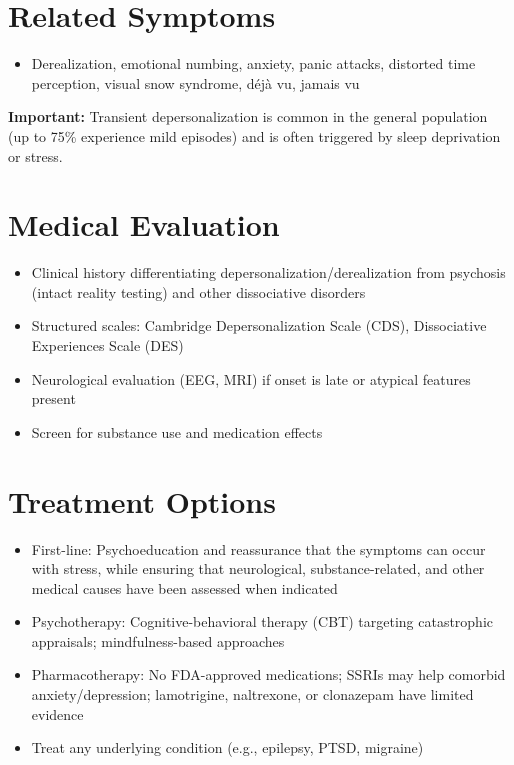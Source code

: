 \section*{Related Symptoms}
\begin{itemize}
  \item Derealization, emotional numbing, anxiety, panic attacks, distorted time perception, visual snow syndrome, déjà vu, jamais vu
\end{itemize}
\textbf{Important:} Transient depersonalization is common in the general population (up to 75\% experience mild episodes) and is often triggered by sleep deprivation or stress.

\section*{Medical Evaluation}
\begin{itemize}
  \item Clinical history differentiating depersonalization/derealization from psychosis (intact reality testing) and other dissociative disorders
  \item Structured scales: Cambridge Depersonalization Scale (CDS), Dissociative Experiences Scale (DES)
  \item Neurological evaluation (EEG, MRI) if onset is late or atypical features present
  \item Screen for substance use and medication effects
\end{itemize}

\section*{Treatment Options}
\begin{itemize}
  \item First-line: Psychoeducation and reassurance that the symptoms can occur with stress, while ensuring that neurological, substance-related, and other medical causes have been assessed when indicated
  \item Psychotherapy: Cognitive-behavioral therapy (CBT) targeting catastrophic appraisals; mindfulness-based approaches
  \item Pharmacotherapy: No FDA-approved medications; SSRIs may help comorbid anxiety/depression; lamotrigine, naltrexone, or clonazepam have limited evidence
  \item Treat any underlying condition (e.g., epilepsy, PTSD, migraine)
\end{itemize}

